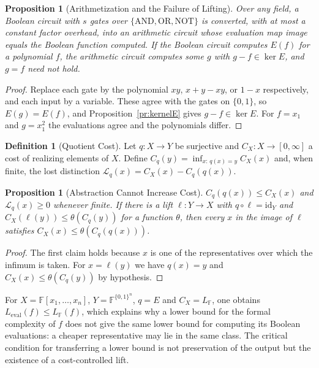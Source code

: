 \documentclass[11pt,letterpaper]{report}
\theoremstyle{plain}
\newtheorem{proposition}[theorem]{Proposition}
\theoremstyle{definition}
\newtheorem{definition}[theorem]{Definition}
\theoremstyle{remark}
\begin{document}
\begin{proposition}[Arithmetization and the Failure of Lifting]\label{pr:arith}
Over any field, a Boolean circuit with $s$ gates over $\{\mathrm{AND},\mathrm{OR},\mathrm{NOT}\}$ is converted, with at most a constant factor overhead, into an arithmetic circuit whose evaluation map image equals the Boolean function computed. If the Boolean circuit computes $E(f)$ for a polynomial $f$, the arithmetic circuit computes some $g$ with $g-f\in\ker E$, and $g=f$ need not hold.
\end{proposition}
\begin{proof}
Replace each gate by the polynomial $xy$, $x+y-xy$, or $1-x$ respectively, and each input by a variable. These agree with the gates on $\{0,1\}$, so $E(g)=E(f)$, and Proposition~\ref{pr:kernelE} gives $g-f\in\ker E$. For $f=x_1$ and $g=x_1^2$ the evaluations agree and the polynomials differ.
\end{proof}

\begin{definition}[Quotient Cost]
Let $q:X\to Y$ be surjective and $C_X:X\to[0,\infty]$ a cost of realizing elements of $X$. Define $C_q(y)=\inf_{x:\,q(x)=y}C_X(x)$ and, when finite, the lost distinction $\mathcal L_q(x)=C_X(x)-C_q(q(x))$.
\end{definition}

\begin{proposition}[Abstraction Cannot Increase Cost]
$C_q(q(x))\le C_X(x)$ and $\mathcal L_q(x)\ge0$ whenever finite. If there is a lift $\ell:Y\to X$ with $q\circ\ell=\mathrm{id}_Y$ and $C_X(\ell(y))\le\theta(C_q(y))$ for a function $\theta$, then every $x$ in the image of $\ell$ satisfies $C_X(x)\le\theta(C_q(q(x)))$.
\end{proposition}
\begin{proof}
The first claim holds because $x$ is one of the representatives over which the infimum is taken. For $x=\ell(y)$ we have $q(x)=y$ and $C_X(x)\le\theta(C_q(y))$ by hypothesis.
\end{proof}

For $X=\mathbb F[x_1,\ldots,x_n]$, $Y=\mathbb F^{\{0,1\}^n}$, $q=E$ and $C_X=L_{\mathbb F}$, one obtains $L_{\mathrm{eval}}(f)\le L_{\mathbb F}(f)$, which explains why a lower bound for the formal complexity of $f$ does not give the same lower bound for computing its Boolean evaluations: a cheaper representative may lie in the same class. The critical condition for transferring a lower bound is not preservation of the output but the existence of a cost-controlled lift.
\end{document}
